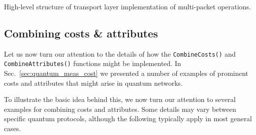 \documentclass[aps, rmp, twocolumn, amsmath, amssymb, nofootinbib, superscriptaddress, longbibliography, floatfix, table-of-contents, eqsecnum]{revtex4-1}
\begin{document}
\begin{table}[!htb]
\caption{High-level structure of transport layer implementation of multi-packet operations.} \label{alg:trans_multi_packet}
\end{table}

%
%

\subsection{Combining costs \& attributes} 

Let us now turn our attention to the details of how the \texttt{CombineCosts()} and \texttt{CombineAttributes()} functions might be implemented. In Sec.~\ref{sec:quantum_meas_cost} we presented a number of examples of prominent costs and attributes that might arise in quantum networks.

To illustrate the basic idea behind this, we now turn our attention to several examples for combining costs and attributes. Some details may vary between specific quantum protocols, although the following typically apply in most general cases.
\end{document}
